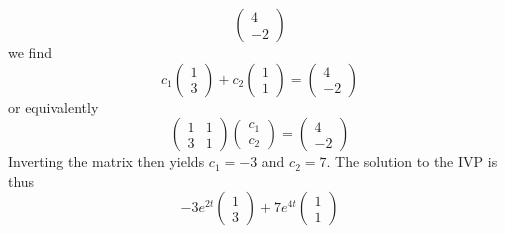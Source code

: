 \documentclass[a4paper,12pt,leqno]{article}
\begin{document}
\begin{enumerate}
\[\begin{pmatrix}
4 \\
-2
\end{pmatrix}
\]
we find 
\[  c_1 \begin{pmatrix}
1 \\
3
\end{pmatrix}
+ c_2  \begin{pmatrix}
1 \\
1
\end{pmatrix} = 
\begin{pmatrix}
4 \\
-2
\end{pmatrix}\]
or equivalently
\[ \begin{pmatrix}
1 & 1 \\
3 & 1 
\end{pmatrix}
\begin{pmatrix}
c_1 \\
c_2
\end{pmatrix}
= 
\begin{pmatrix}
4 \\
-2
\end{pmatrix}\]
Inverting the matrix then yields $c_1 = -3$ and $c_2 = 7.$ The solution to the IVP is thus
\[ -3 e^{2t} \begin{pmatrix}
1 \\
3
\end{pmatrix}
+ 7 e^{4t} \begin{pmatrix}
1 \\
1
\end{pmatrix} \]
\end{enumerate}
\end{document}
